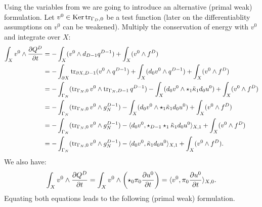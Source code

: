 \begin{discussion}
  Using the variables from
  we are going to introduce an alternative (primal weak) formulation.
  Let $v^0 \in \mathop{\rm Ker}\nolimits \mathop{\rm tr}\nolimits_{\Gamma_D, 0}$ be a test function
  (later on the differentiablity assumptions on $v^0$ can be weakened).
  Multiply the conservation of energy with $v^0$ and integrate over $X$:
  \begin{equation}
    \begin{split}
      \int_X v^0 \wedge \frac{\partial Q^D}{\partial t}
      & = - \int_X (v^0 \wedge d_{D - 1} q^{D - 1}) + \int_X (v^0 \wedge f^D) \\
      & = - \int_{\partial X} \mathop{\rm tr}\nolimits_{\partial X, D - 1} (v^0 \wedge q^{D - 1})
        + \int_X (d_0 v^0 \wedge q^{D - 1})
        + \int_X (v^0 \wedge f^D) \\
      & =
        - \int_{\Gamma_N}
          (\mathop{\rm tr}\nolimits_{\Gamma_N, 0} v^0 \wedge \mathop{\rm tr}\nolimits_{\Gamma_N, D - 1} q^{D - 1})
        - \int_X (d_0 v^0 \wedge \star_1 \tilde{\kappa}_1 d_0 u^0)
        + \int_X (v^0 \wedge f^D) \\
      & = - \int_{\Gamma_N} (\mathop{\rm tr}\nolimits_{\Gamma_N, 0} v^0 \wedge g_N^{D - 1})
        - \int_X (d_0 v^0 \wedge \star_1 \tilde{\kappa}_1 d_0 u^0)
        + \int_X (v^0 \wedge f^D) \\
      & = - \int_{\Gamma_N} (\mathop{\rm tr}\nolimits_{\Gamma_N, 0} v^0 \wedge g_N^{D - 1})
        - \langle d_0 v^0,\star_{D - 1} \star_1 \tilde{\kappa}_1 d_0 u^0\rangle_{X, 1}
        + \int_X (v^0 \wedge f^D) \\
      & = - \int_{\Gamma_N} (\mathop{\rm tr}\nolimits_{\Gamma_N, 0} v^0 \wedge g_N^{D - 1})
        - \langle d_0 v^0,\tilde{\kappa}_1 d_0 u^0\rangle_{X, 1}
        + \int_X (v^0 \wedge f^D).
    \end{split}
  \end{equation}
  We also have:
  \begin{equation}
    \int_X v^0 \wedge \frac{\partial Q^D}{\partial t}
    = \int_X v^0 \wedge
      \left(\star_0 \pi_0 \frac{\partial u^0}{\partial t}\right)
    =  \langle v^0,\pi_0 \frac{\partial u^0}{\partial t}\rangle_{X, 0}.
  \end{equation}
  Equating both equations leads to the following (primal weak) formulation.
\end{discussion}
